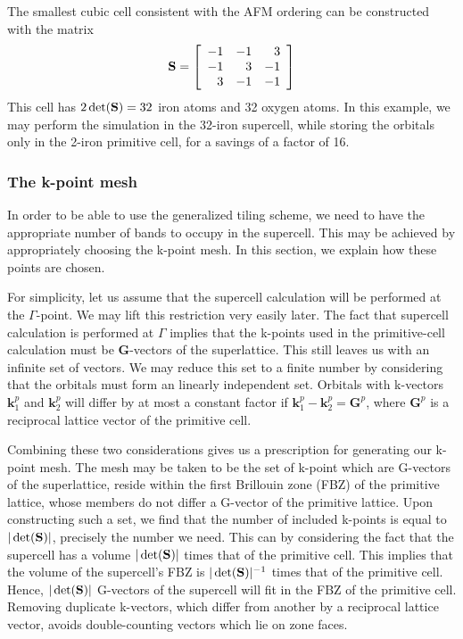 The smallest cubic cell consistent with the AFM ordering can be
constructed with the matrix
\begin{equation}
\mathbf{S} = \left[\begin{array}{rrr}
  -1 & -1 &  3 \\
  -1 &  3 & -1 \\
   3 & -1 & -1 
  \end{array}\right]
\end{equation}
This cell has $2\det(\mathbf{S}) = 32$ iron atoms and 32 oxygen atoms.  In
this example, we may perform the simulation in the 32-iron supercell,
while storing the orbitals only in the 2-iron primitive cell, for a
savings of a factor of 16.  

\subsubsection{The k-point mesh}
In order to be able to use the generalized tiling scheme, we need to
have the appropriate number of bands to occupy in the supercell.
This may be achieved by appropriately choosing the k-point mesh.  In
this section, we explain how these points are chosen.  

For simplicity, let us assume that the supercell calculation will be
performed at the $\Gamma$-point.  We may lift this restriction very
easily later.  The fact that supercell calculation is performed at
$\Gamma$ implies that the k-points used in the primitive-cell
calculation must be $\mathbf{G}$-vectors of the superlattice.  This
still leaves us with an infinite set of vectors.  We may reduce this
set to a finite number by considering that the orbitals must form an
linearly independent set.  Orbitals with k-vectors $\mathbf{k}^p_1$
and $\mathbf{k}^p_2$ will differ by at most a constant factor if
$\mathbf{k}^p_1 - \mathbf{k}^p_2 = \mathbf{G}^p$, where $\mathbf{G}^p$
is a reciprocal lattice vector of the primitive cell.  

Combining these two considerations gives us a prescription for
generating our k-point mesh.  The mesh may be taken to be the set of
k-point which are G-vectors of the superlattice, reside within the
first Brillouin zone (FBZ) of the primitive lattice, whose members do
not differ a G-vector of the primitive lattice.  Upon constructing
such a set, we find that the number of included k-points is equal to
$|\det(\mathbf{S})|$, precisely the number we need.  This can by considering
the fact that the supercell has a volume $|\det(\mathbf{S})|$ times that of
the primitive cell.  This implies that the volume of the supercell's
FBZ is $|\det(\mathbf{S})|^{-1}$ times that of the primitive cell.  Hence,
$|\det(\mathbf{S})|$ G-vectors of the supercell will fit in the FBZ of the
primitive cell.  Removing duplicate k-vectors, which differ from
another by a reciprocal lattice vector, avoids double-counting vectors
which lie on zone faces.

